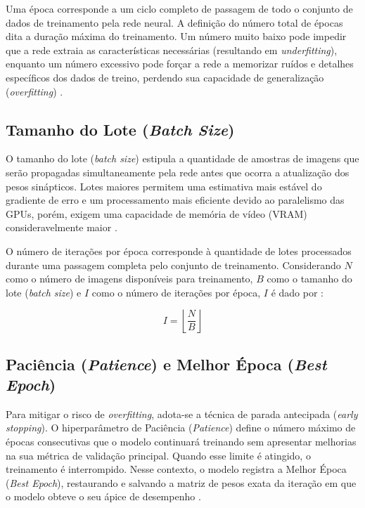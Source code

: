 Uma época corresponde a um ciclo completo de passagem de todo o conjunto de dados de
treinamento pela rede neural. A definição do número total de épocas dita a duração máxima
do treinamento. Um número muito baixo pode impedir que a rede extraia as características
necessárias (resultando em \textit{underfitting}), enquanto um número excessivo pode
forçar a rede a memorizar ruídos e detalhes específicos dos dados de treino, perdendo
sua capacidade de generalização (\textit{overfitting}) \cite{goodfellow2016deep}.

\subsection{Tamanho do Lote (\textit{Batch Size})}
\label{subsec:batch-size}

O tamanho do lote (\textit{batch size}) estipula a quantidade de amostras de imagens que
serão propagadas simultaneamente pela rede antes que ocorra a atualização dos pesos
sinápticos. Lotes maiores permitem uma estimativa mais estável do gradiente de erro e um
processamento mais eficiente devido ao paralelismo das GPUs, porém, exigem uma capacidade de
memória de vídeo (VRAM) consideravelmente maior \cite{goodfellow2016deep}.

O número de iterações por época corresponde à quantidade de lotes processados durante uma
passagem completa pelo conjunto de treinamento. Considerando $N$ como o número de imagens
disponíveis para treinamento, $B$ como o tamanho do lote (\textit{batch size}) e $I$ como o
número de iterações por época, $I$ é dado por \cite{goodfellow2016deep}:

\begin{equation}
    I = \left\lfloor \frac{N}{B} \right\rfloor
\end{equation}

\subsection{Paciência (\textit{Patience}) e Melhor Época (\textit{Best Epoch})}

Para mitigar o risco de \textit{overfitting}, adota-se a técnica de parada antecipada
(\textit{early stopping}). O hiperparâmetro de Paciência (\textit{Patience}) define o
número máximo de épocas consecutivas que o modelo continuará treinando sem apresentar
melhorias na sua métrica de validação principal. Quando esse limite é atingido, o
treinamento é interrompido. Nesse contexto, o modelo registra a Melhor Época
(\textit{Best Epoch}), restaurando e salvando a matriz de pesos exata da iteração em
que o modelo obteve o seu ápice de desempenho \cite{goodfellow2016deep}.

